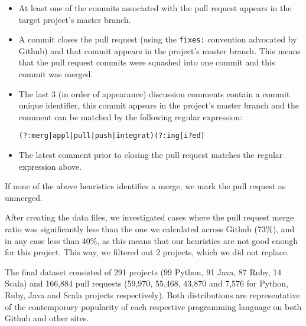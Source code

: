 \documentclass{sig-alternate}
\begin{document}
\begin{itemize}

  \item At least one of the commits associated with the pull request appears in
    the target project's master branch. 

  \item A commit closes the pull request (using the \texttt{fixes:} convention
    advocated by Github) and that commit appears in the project's master branch.
    This means that the pull request commits were squashed into one commit and
    this commit was merged.

  \item The last 3 (in order of appearance) discussion comments contain
    a commit unique identifier, this commit appears in the
    project's master branch and the comment can be matched by the following 
    regular expression:

    \begin{small}
    \texttt{(?:merg|appl|pull|push|integrat)(?:ing|i?ed)}
    \end{small}
  \item The latest comment prior to closing the pull request matches the 
    regular expression above.

\end{itemize}

If none of the above heuristics identifies a merge, we mark the pull request
as unmerged. 

After creating the data files, we investigated cases where the pull request
merge ratio was significantly less than the one we calculated across Github
(73\%), and in any case less than 40\%, as this means that our heuristics are not
good enough for this project. This way, we filtered out 2 projects, which we did not
replace.

The final dataset consisted of 291 projects (99 Python, 91 Java, 87 Ruby, 14
Scala) and 166,884 pull requests (59,970, 55,468, 43,870 and 7,576 for Python,
Ruby, Java and Scala projects respectively). Both distributions are
representative of the contemporary popularity of each respective programming
language on both Github and other sites.

%
\end{document}
